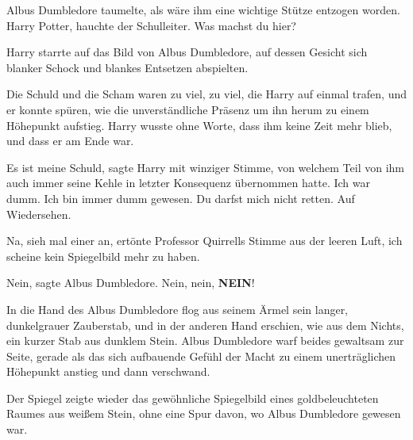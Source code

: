 Albus Dumbledore taumelte, als wäre ihm eine wichtige Stütze entzogen worden.
\glqq{}Harry Potter\grqq{}, hauchte der Schulleiter. \glqq{}Was machst du hier?\grqq{}

Harry starrte auf das Bild von Albus Dumbledore, auf dessen Gesicht sich blanker
Schock und blankes Entsetzen abspielten.

Die Schuld und die Scham waren zu viel, zu viel, die Harry auf einmal trafen,
und er konnte spüren, wie die unverständliche Präsenz um ihn herum zu einem
Höhepunkt aufstieg. Harry wusste ohne Worte, dass ihm keine Zeit mehr blieb, und
dass er am Ende war.

\glqq{}Es ist meine Schuld\grqq{}, sagte Harry mit winziger Stimme, von welchem
Teil von ihm auch immer seine Kehle in letzter Konsequenz übernommen hatte.
\glqq{}Ich war dumm. Ich bin immer dumm gewesen. Du darfst mich nicht retten. Auf
Wiedersehen.\grqq{}

\glqq{}Na, sieh mal einer an\grqq{}, ertönte Professor Quirrells Stimme aus der
leeren Luft, \glqq{}ich scheine kein Spiegelbild mehr zu haben.\grqq{}

\glqq{}Nein\grqq{}, sagte Albus Dumbledore. \glqq{}Nein, nein, \textbf{NEIN}!\grqq{}

In die Hand des Albus Dumbledore flog aus seinem Ärmel sein langer, dunkelgrauer
Zauberstab, und in der anderen Hand erschien, wie aus dem Nichts, ein kurzer
Stab aus dunklem Stein. Albus Dumbledore warf beides gewaltsam zur Seite, gerade
als das sich aufbauende Gefühl der Macht zu einem unerträglichen Höhepunkt
anstieg und dann verschwand.

Der Spiegel zeigte wieder das gewöhnliche Spiegelbild eines goldbeleuchteten
Raumes aus weißem Stein, ohne eine Spur davon, wo Albus Dumbledore gewesen war.

